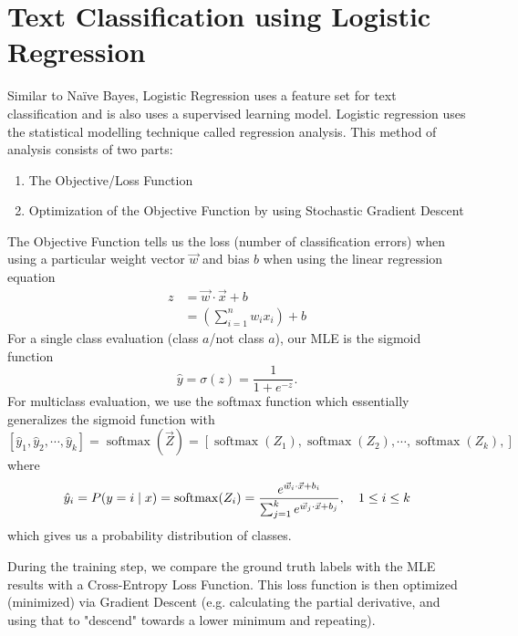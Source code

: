 \documentclass[12pt]{report}
\begin{document}
\section{Text Classification using Logistic Regression}
Similar to Na\"ive Bayes, Logistic Regression uses a feature set for text
classification and is also uses a supervised learning model.  Logistic
regression uses the statistical modelling technique called regression analysis.
This method of analysis consists of two parts:
\begin{enumerate}
  \item The Objective/Loss Function
  \item Optimization of the Objective Function by using Stochastic Gradient
  Descent
\end{enumerate}
The Objective Function tells us the loss (number of classification errors) when
using a particular weight vector $\vec{w}$ and bias $b$ when using the linear
regression equation
\begin{align*}
  z &= \vec{w} \cdot \vec{x} + b\\
  &= \left(\sum_{i = 1}^n w_i x_i \right) + b
\end{align*}
For a single class evaluation (class $a$/not class $a$), our MLE is the sigmoid function
\[ \hat{y} = \sigma(z) = \frac{1}{1 + e^{ - z}}. \]
For multiclass evaluation, we use the softmax function which essentially
generalizes the sigmoid function with
\[
  [\hat{y}_1, \hat{y}_2, \cdots, \hat{y}_k] = \operatorname*{softmax}\left(\vec Z\right) 
    = \left[ \operatorname*{softmax}\left(Z_1\right), \operatorname*{softmax}\left(Z_2\right), \cdots, \operatorname*{softmax}\left(Z_k\right),  \right]
\]
where
\[
  \hat{y}_i = P\giventhat{y = i}{x} = \operatorname*{softmax}(Z_i)
      = \frac{e^{\vec{w}_i\cdot\vec{x} + b_i}}
      {\sum_{j = 1}^ke^{\vec{w}_j\cdot\vec{x} + b_j}},\quad 1 \leq i \leq k
\]
which gives us a probability distribution of classes.

During the training step, we compare the ground truth labels with the MLE
results with a Cross-Entropy Loss Function.  This loss function is then
optimized (minimized) via Gradient Descent (e.g. calculating the partial
derivative, and using that to "descend" towards a lower minimum and repeating).
\end{document}
